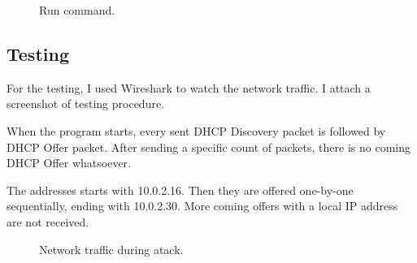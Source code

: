 \documentclass[10pt,a4paper,titlepage]{article}
\begin{document}
    \begin{figure}[h!]
        \begin{center}
            \caption{ Run command. \label{fig:run}}
        \end{center}
    \end{figure}
    
    
    \subsection*{Testing}
    For the testing, I used Wireshark to watch the network traffic. I attach a
    screenshot of testing procedure.
    
    When the program starts, every sent DHCP Discovery packet is followed by DHCP Offer
    packet. After sending a specific count of packets, there is no coming DHCP
    Offer whatsoever.
    
    The addresses starts with 10.0.2.16. Then they are offered one-by-one sequentially,
    ending with 10.0.2.30. More coming offers with a local IP address are not
    received.
    
    \begin{figure}[h!]
        \begin{center}
            \caption{ Network traffic during atack. \label{fig:wireshark}}
        \end{center}
    \end{figure}
    
    \newpage
    \printbibliography
    
    
\end{document}
